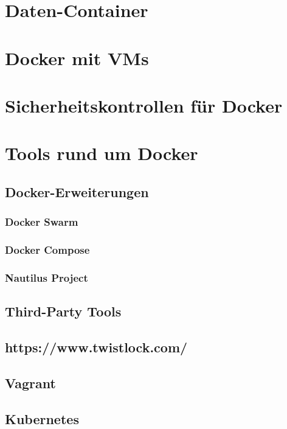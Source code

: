 \documentclass[../main.tex]{subfiles}
\begin{document}
	\section{Daten-Container}
	\section{Docker mit \acrshort{VM}s}
  \section{Sicherheitskontrollen für Docker}
	\section{Tools rund um Docker}
    \subsection{Docker-Erweiterungen}
      \subsubsection{Docker Swarm}
      \subsubsection{Docker Compose}
      \subsubsection{Nautilus Project}
    \subsection{Third-Party Tools}
      \subsection{https://www.twistlock.com/}
  		\subsection{Vagrant}
  		\subsection{Kubernetes}
\end{document}
